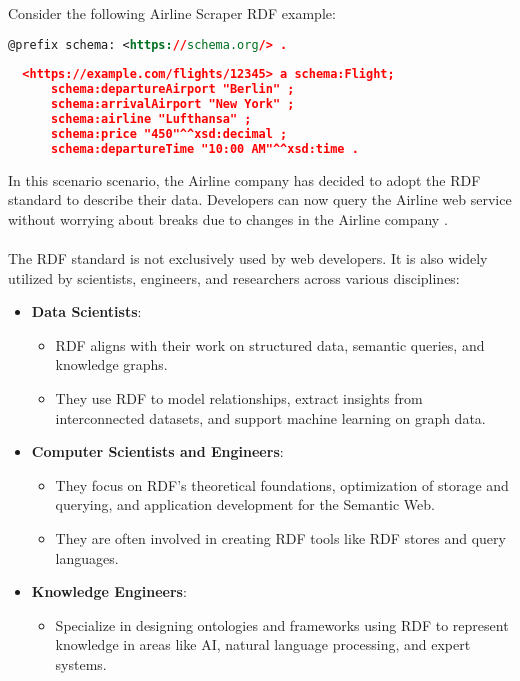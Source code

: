 Consider the following Airline Scraper RDF example:
\begin{lstlisting}[language=XML, caption={RDF representation of the flight data}, label={lst:rdf-example}]
  @prefix schema: <https://schema.org/> .
  
  <https://example.com/flights/12345> a schema:Flight;
      schema:departureAirport "Berlin" ;
      schema:arrivalAirport "New York" ;
      schema:airline "Lufthansa" ;
      schema:price "450"^^xsd:decimal ;
      schema:departureTime "10:00 AM"^^xsd:time .
  \end{lstlisting}
  In this scenario scenario, the Airline company has decided to adopt the RDF standard to describe their data.
  Developers can now query the Airline web service without worrying about breaks due to changes in the Airline company \cite{herman2003semanticweb}. 
\\
\\
The RDF standard is not exclusively used by web developers. It is also widely utilized by scientists, engineers, and researchers across various disciplines:
\begin{itemize}
  \item \textbf{Data Scientists}:
  \begin{itemize}
      \item RDF aligns with their work on structured data, semantic queries, and knowledge graphs.
      \item They use RDF to model relationships, extract insights from interconnected datasets, and support machine learning on graph data.
  \end{itemize}
  
  \item \textbf{Computer Scientists and Engineers}:
  \begin{itemize}
      \item They focus on RDF’s theoretical foundations, optimization of storage and querying, and application development for the Semantic Web.
      \item They are often involved in creating RDF tools like RDF stores and query languages.
  \end{itemize}
  
  \item \textbf{Knowledge Engineers}:
  \begin{itemize}
      \item Specialize in designing ontologies and frameworks using RDF to represent knowledge in areas like AI, natural language processing, and expert systems.
  \end{itemize}
\end{itemize}

